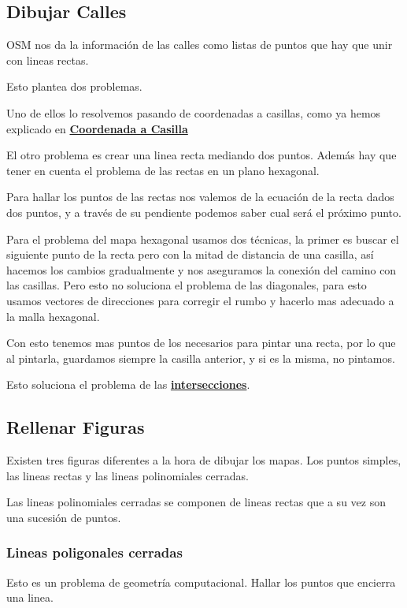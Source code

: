 \subsection*{Dibujar Calles}
OSM nos da la información de las calles como listas de puntos que hay que unir
con lineas rectas.

Esto plantea dos problemas.

Uno de ellos lo resolvemos pasando de coordenadas a casillas, como ya hemos
explicado en \hyperref[coordToCasilla]{\bf Coordenada a Casilla}

El otro problema es crear una linea recta mediando dos puntos.
Además hay que tener en cuenta el problema de las rectas en un plano hexagonal.

Para hallar los puntos de las rectas nos valemos de la ecuación de la recta
dados dos puntos, y a través de su pendiente podemos saber cual será el próximo
punto.

Para el problema del mapa hexagonal usamos dos técnicas, la primer es buscar el
siguiente punto de la recta pero con la mitad de distancia de una casilla, así
hacemos los cambios gradualmente y nos aseguramos la conexión del camino con
las casillas.
Pero esto no soluciona el problema de las diagonales, para esto usamos vectores
de direcciones para corregir el rumbo y hacerlo mas adecuado a la malla
hexagonal.

Con esto tenemos mas puntos de los necesarios para pintar una recta, por lo que
al pintarla, guardamos siempre la casilla anterior, y si es la misma, no
pintamos. 

Esto soluciona el problema de las \hyperref[Intersecciones]
{\bf intersecciones}.
\subsection*{Rellenar Figuras}
Existen tres figuras diferentes a la hora de dibujar los mapas.
Los puntos simples, las lineas rectas y las lineas polinomiales cerradas.

Las lineas polinomiales cerradas se componen de lineas rectas que a su vez son
una sucesión de puntos.

\subsubsection*{Lineas poligonales cerradas}
Esto es un problema de geometría computacional. Hallar los puntos que encierra
una linea.

